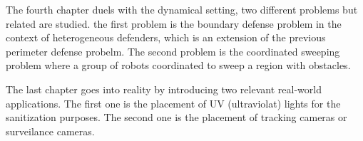 \begin{my_abstract}
The fourth chapter duels with the dynamical setting, two different problems but related are studied. 
the first problem is the boundary defense problem in the context of heterogeneous defenders, which is an extension of the previous
perimeter defense probelm. 
The second problem is the coordinated sweeping problem where a group of robots coordinated to sweep a region with obstacles. 

The last chapter goes into reality by introducing two relevant real-world applications. 
The first one is the placement of UV (ultraviolat) lights for the sanitization purposes.
The second one is the placement of tracking cameras or surveilance cameras. 


\end{my_abstract}
